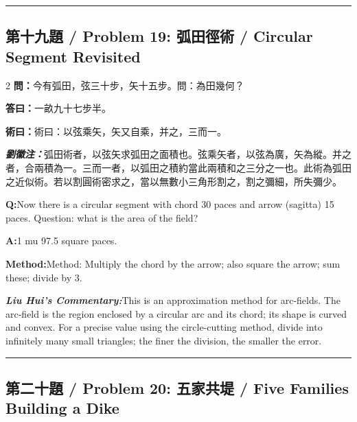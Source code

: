 \documentclass[11pt,a4paper]{article}
\newcommand{\cnwen}{\textcolor{cnlabelfg}{\textbf{問：}}}
\newcommand{\cnda}{\textbf{答曰：}}
\newcommand{\cnshu}{\textcolor{cnlabelfg}{\textbf{術曰：}}}
\newcommand{\cnzhu}{\textcolor{commentarycolor}{\textit{\textbf{劉徽注：}}}}
\newcommand{\enwen}{\textcolor{enlabelfg}{\textbf{Q:}}}
\newcommand{\enda}{\textcolor{enlabelfg}{\textbf{A:}}}
\newcommand{\enshu}{\textcolor{enlabelfg}{\textbf{Method:}}}
\newcommand{\enzhu}{\textcolor{enlabelfg}{\textit{\textbf{Liu Hui's Commentary:}}}}
\begin{document}
\bigskip\hrule\bigskip

\subsection{第十九題 / Problem 19: 弧田徑術 / Circular Segment Revisited}

\begin{paracol}{2}
\switchcolumn[0]
\cnwen 今有弧田，弦三十步，矢十五步。問：為田幾何？

\cnda 一畝九十七步半。

\cnshu 術曰：以弦乘矢，矢又自乘，并之，三而一。

\cnzhu 弧田術者，以弦矢求弧田之面積也。弦乘矢者，以弦為廣，矢為縱。并之者，合兩積為一。三而一者，以弧田之積約當此兩積和之三分之一也。此術為弧田之近似術。若以割圓術密求之，當以無數小三角形割之，割之彌細，所失彌少。

\switchcolumn[1]
\enwen Now there is a circular segment with chord 30 paces and arrow (sagitta) 15 paces. Question: what is the area of the field?

\enda 1 mu 97.5 square paces.

\enshu Method: Multiply the chord by the arrow; also square the arrow; sum these; divide by 3.

\enzhu This is an approximation method for arc-fields. The arc-field is the region enclosed by a circular arc and its chord; its shape is curved and convex. For a precise value using the circle-cutting method, divide into infinitely many small triangles; the finer the division, the smaller the error.
\end{paracol}

\bigskip\hrule\bigskip

\subsection{第二十題 / Problem 20: 五家共堤 / Five Families Building a Dike}
\end{document}
